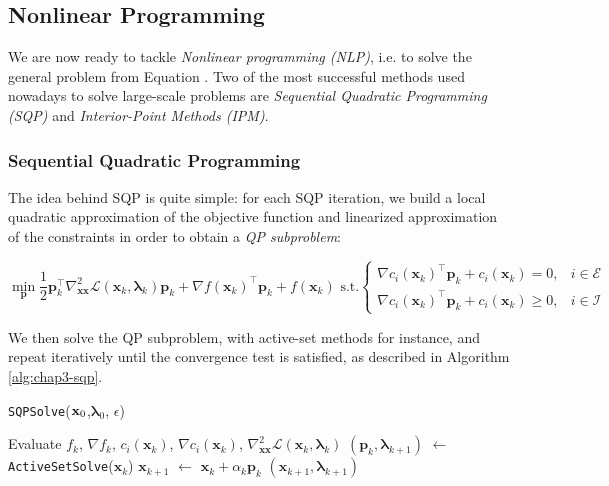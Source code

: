 \subsection{Nonlinear Programming}

We are now ready to tackle \emph{Nonlinear programming (NLP)}, i.e. to
solve the general problem from Equation . Two of the
most successful methods used nowadays to solve large-scale problems
are \emph{Sequential Quadratic Programming (SQP)} and
\emph{Interior-Point Methods (IPM)}.

\subsubsection{Sequential Quadratic Programming}
\label{subsubsec:chap3-sqp}

The idea behind SQP is quite simple: for each SQP iteration, we build
a local quadratic approximation of the objective function and
linearized approximation of the constraints in order to obtain a
\emph{QP subproblem}:

\begin{equation}
\min_{\mathbf{p}}\frac{1}{2}\mathbf{p}_k^{\top}\nabla_{\mathbf{x}\mathbf{x}}^2\mathcal{L}(\mathbf{x}_k,\boldsymbol{\lambda}_k)\mathbf{p}_k+\nabla f(\mathbf{x}_k)^{\top}\mathbf{p}_k+f(\mathbf{x}_k)
\text{ s.t.}
\left\{\begin{array}{cc}
\nabla c_i(\mathbf{x}_k)^{\top}\mathbf{p}_k+c_i(\mathbf{x}_k) = 0, & i \in \mathcal{E} \\
\nabla c_i(\mathbf{x}_k)^{\top}\mathbf{p}_k+c_i(\mathbf{x}_k) \ge 0, & i \in \mathcal{I}
\end{array}\right.
\end{equation}

We then solve the QP subproblem, with active-set methods for instance,
and repeat iteratively until the convergence test is satisfied, as
described in Algorithm \ref{alg:chap3-sqp}.

\begin{algorithm}
\caption{\texttt{SQPSolve}($\mathbf{x}_0$,$\boldsymbol{\lambda}_0$, $\epsilon$)}
\label{alg:chap3-sqp}
\begin{algorithmic}
\STATE Evaluate $f_k$, $\nabla f_k$, $c_i(\mathbf{x}_k)$, $\nabla c_i(\mathbf{x}_k)$, $\nabla_{\mathbf{x}\mathbf{x}}^2\mathcal{L}(\mathbf{x}_k,\boldsymbol{\lambda}_k)$
\STATE $(\mathbf{p}_k, \boldsymbol{\lambda}_{k+1})$ $\leftarrow$ \texttt{ActiveSetSolve}($\mathbf{x}_k$)
\STATE $\mathbf{x}_{k+1}$ $\leftarrow$ $\mathbf{x}_k + \alpha_k\mathbf{p}_k$
\RETURN $(\mathbf{x}_{k+1},\boldsymbol{\lambda}_{k+1})$
\ENDIF
\ENDFOR
\end{algorithmic}
\end{algorithm}

